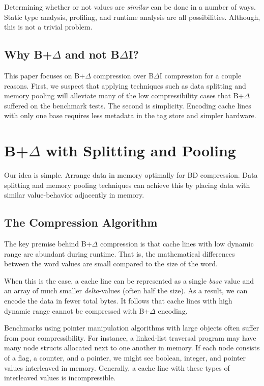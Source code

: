 \documentclass[pageno]{jpaper}
\begin{document}
Determining whether or not values are \textit{similar} can be done in a number of ways. Static type analysis, profiling, and runtime analysis are all possibilities.  Although, this is not a trivial problem.


\subsection{Why B+$\Delta$ and not B$\Delta$I?}

This paper focuses on B+$\Delta$ compression over B$\Delta$I compression for a couple reasons. First, we suspect that applying techniques such as data splitting and memory pooling will alleviate many of the low compressibility cases that B+$\Delta$ suffered on the benchmark tests. The second is simplicity. Encoding cache lines with only one base requires less metadata in the tag store and simpler hardware.


\section{B+$\Delta$ with Splitting and Pooling}

Our idea is simple. Arrange data in memory optimally for BD compression. Data splitting and memory pooling techniques can achieve this by placing data with similar value-behavior adjacently in memory.

\subsection{The Compression Algorithm}

The key premise behind B+$\Delta$  compression is that cache lines with low dynamic range are abundant during runtime. That is, the mathematical differences between the word values are small compared to the size of the word.

When this is the case, a cache line can be represented as a single \textit{base} value and an array of much smaller \textit{delta}-values (often half the size). As a result, we can encode the data in fewer total bytes. It follows that cache lines with high dynamic range cannot be compressed with B+$\Delta$ encoding.

Benchmarks using pointer manipulation algorithms with large objects often suffer from poor compressibility. For instance, a linked-list traversal program may have many node structs allocated next to one another in memory. If each node consists of a flag, a counter, and a pointer, we might see boolean, integer, and pointer values interleaved in memory. Generally, a cache line with these types of interleaved values is incompressible.
\end{document}
